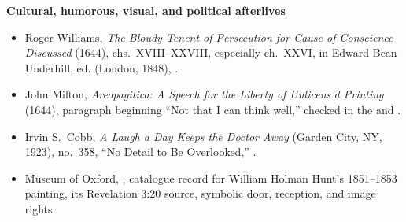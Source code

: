 \textbf{Cultural, humorous, visual, and political afterlives}
{\footnotesize
\begin{itemize}[itemsep=0em,topsep=0.15em,parsep=0pt]
\item Roger Williams, \emph{The Bloudy Tenent of Persecution for Cause of Conscience Discussed} (1644), chs.~XVIII--XXVIII, especially ch.~XXVI, in Edward Bean Underhill, ed. (London, 1848), .
\item John Milton, \emph{Areopagitica: A Speech for the Liberty of Unlicens'd Printing} (1644), paragraph beginning “Not that I can think well,” checked in the  and .
\item Irvin S.~Cobb, \emph{A Laugh a Day Keeps the Doctor Away} (Garden City, NY, 1923), no.~358, “No Detail to Be Overlooked,” .
\item Museum of Oxford, , catalogue record for William Holman Hunt's 1851--1853 painting, its Revelation 3:20 source, symbolic door, reception, and image rights.
\end{itemize}}
